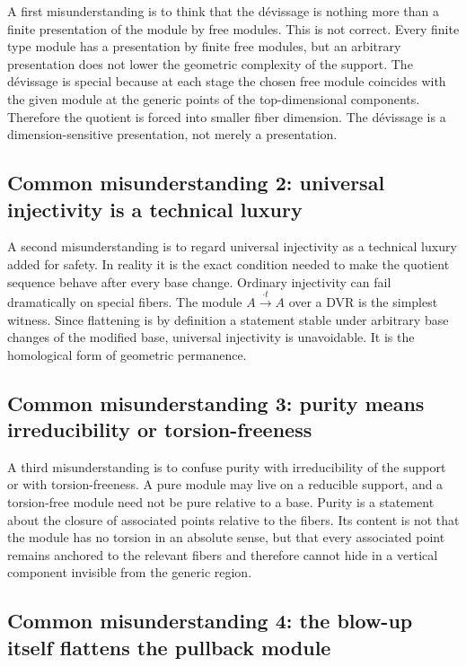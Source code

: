 \documentclass[11pt,oneside]{article}
\begin{document}
A first misunderstanding is to think that the d\'evissage is nothing more than a finite presentation of the module by free modules.  This is not correct.  Every finite type module has a presentation by finite free modules, but an arbitrary presentation does not lower the geometric complexity of the support.  The d\'evissage is special because at each stage the chosen free module coincides with the given module at the generic points of the top-dimensional components.  Therefore the quotient is forced into smaller fiber dimension.  The d\'evissage is a dimension-sensitive presentation, not merely a presentation.

\subsection*{Common misunderstanding 2: universal injectivity is a technical luxury}

A second misunderstanding is to regard universal injectivity as a technical luxury added for safety.  In reality it is the exact condition needed to make the quotient sequence behave after every base change.  Ordinary injectivity can fail dramatically on special fibers.  The module $A\xrightarrow{\cdot t}A$ over a DVR is the simplest witness.  Since flattening is by definition a statement stable under arbitrary base changes of the modified base, universal injectivity is unavoidable.  It is the homological form of geometric permanence.

\subsection*{Common misunderstanding 3: purity means irreducibility or torsion-freeness}

A third misunderstanding is to confuse purity with irreducibility of the support or with torsion-freeness.  A pure module may live on a reducible support, and a torsion-free module need not be pure relative to a base.  Purity is a statement about the closure of associated points relative to the fibers.  Its content is not that the module has no torsion in an absolute sense, but that every associated point remains anchored to the relevant fibers and therefore cannot hide in a vertical component invisible from the generic region.

\subsection*{Common misunderstanding 4: the blow-up itself flattens the pullback module}
\end{document}
